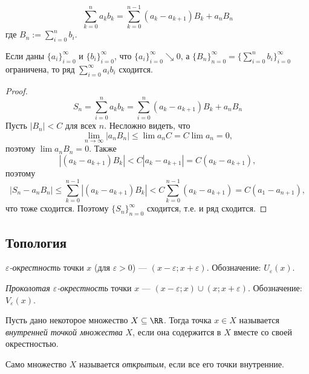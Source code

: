 \documentclass[12pt,a4paper]{article}
\begin{document}
    \begin{lemma}
        \[\sum_{k=0}^n a_k b_k = \sum_{k=0}^{n-1} (a_k - a_{k+1})B_k + a_n B_n\]
        где $B_n := \sum_{i=0}^n b_i$.
    \end{lemma}

    \begin{theorem}
        Если даны $\{a_i\}_{i=0}^\infty$ и $\{b_i\}_{i=0}^\infty$, что $\{a_i\}_{i=0}^\infty \searrow 0$, а $\{B_n\}_{n=0}^\infty = \{\sum_{i=0}^n b_i\}_{i=0}^\infty$ ограничена, то ряд $\sum_{i=0}^\infty a_i b_i$ сходится.
    \end{theorem}

    \begin{proof}
        \[S_n = \sum_{i=0}^n a_k b_k = \sum_{i=0}^n (a_k - a_{k+1}) B_k + a_n B_n\]
        Пусть $|B_n| < C$ для всех $n$. Несложно видеть, что 
        \[\lim_{n \to \infty} |a_n B_n| \leqslant \lim a_n C = C \lim a_n = 0,\]
        поэтому $\lim a_n B_n = 0$. Также
        \[|(a_k-a_{k+1}) B_k| < C |a_k - a_{k+1}| = C(a_k - a_{k+1}),\]
        поэтому
        \[|S_n - a_n B_n| \leqslant \sum_{k=0}^{n-1} |(a_k - a_{k+1})B_k| < C \sum_{k=0}^{n-1} (a_k - a_{k+1}) = C(a_1 - a_{n+1}),\]
        что тоже сходится. Поэтому $\{S_n\}_{n=0}^\infty$ сходится, т.е. и ряд сходится.
    \end{proof}

    \subsection{Топология}

    \begin{definition}
        \emph{$\varepsilon$-окрестность} точки $x$ (для $\varepsilon > 0$) --- $(x - \varepsilon; x+ \varepsilon)$. Обозначение: $U_\varepsilon(x)$.

        \emph{Проколотая $\varepsilon$-окрестность} точки $x$ --- $(x - \varepsilon; x) \cup (x; x + \varepsilon)$. Обозначение: $V_\varepsilon(x)$.
    \end{definition}

    \begin{definition}
        Пусть дано некоторое множество $X \subseteq \RR$. Тогда точка $x \in X$ называется \emph{внутренней точкой множества} $X$, если она содержится в $X$ вместе со своей окрестностью.
        
        Само множество $X$ называется \emph{открытым}, если все его точки внутренние.
    \end{definition}
\end{document}

